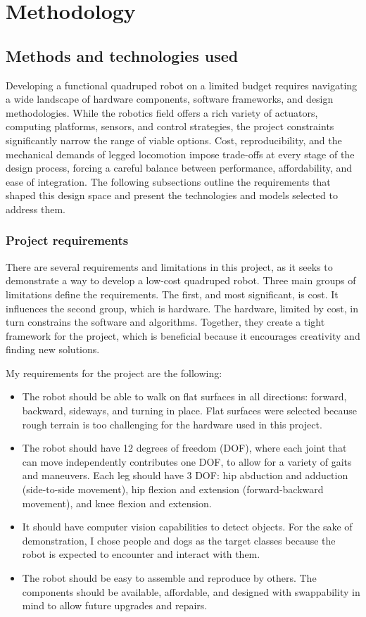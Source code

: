 \documentclass[a4paper,12pt]{report}
\begin{document}
\chapter{Methodology}
\section{Methods and technologies used}
Developing a functional quadruped robot on a limited budget requires navigating a wide landscape
of hardware components, software frameworks, and design methodologies. While the robotics field
offers a rich variety of actuators, computing platforms, sensors, and control strategies, the
project constraints significantly narrow the range of viable options. Cost, reproducibility, and
the mechanical demands of legged locomotion impose trade-offs at every stage of the design
process, forcing a careful balance between performance, affordability, and ease of integration.
The following subsections outline the requirements that shaped this design space and present the
technologies and models selected to address them.

\subsection{Project requirements}
\label{subsec:project-requirements}
There are several requirements and limitations in this project, as it seeks to demonstrate a way
to develop a low-cost quadruped robot. Three main groups of limitations define the requirements.
The first, and most significant, is cost. It influences the second group, which is hardware. The
hardware, limited by cost, in turn constrains the software and algorithms. Together, they create a
tight framework for the project, which is beneficial because it encourages creativity and finding
new solutions.

My requirements for the project are the following:
\begin{itemize}
    \item The robot should be able to walk on flat surfaces in all directions: forward, backward,
  sideways, and turning in place. Flat surfaces were selected because rough terrain is too
  challenging for the hardware used in this project.
    \item The robot should have 12 degrees of freedom (DOF), where each joint that can move
independently contributes one DOF, to allow for a variety of gaits and maneuvers. Each leg
should have 3 DOF: hip abduction and adduction (side-to-side movement), hip flexion and extension
(forward-backward movement), and knee flexion and extension.
    \item It should have computer vision capabilities to detect objects. For the sake of
demonstration, I chose people and dogs as the target classes because the robot is expected to
encounter and interact with them.
    \item The robot should be easy to assemble and reproduce by others. The components should be
  available, affordable, and designed with swappability in mind to allow future upgrades and
  repairs.
\end{itemize}
\end{document}
